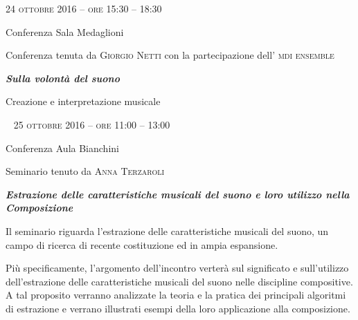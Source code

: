 
\begin{flushright}

\large{
	\scshape{
	24 ottobre 2016 -- ore 15:30 -- 18:30
	}}

\medskip
	
\small{Conferenza
	\newline Sala Medaglioni}

\medskip

{\fontsize{42}{42} }

\normalfont

\normalsize

\bigskip

Conferenza tenuta da \textsc{Giorgio Netti} con la partecipazione dell' \textsc{mdi ensemble}

\bigskip

\textbf{\emph{Sulla volontà del suono}}

Creazione e interpretazione musicale


%
%

~\vfill
\large{
	\scshape{
	25 ottobre 2016 -- ore 11:00 -- 13:00
	}}

\medskip
	
\small{Conferenza
	\newline Aula Bianchini}

\medskip

{\fontsize{42}{42} }

\normalfont

\normalsize

\bigskip

Seminario tenuto da \textsc{Anna Terzaroli}

\bigskip

\textbf{\emph{Estrazione delle caratteristiche musicali del suono e loro utilizzo nella Composizione}}

Il seminario riguarda l'estrazione delle caratteristiche musicali del suono, un campo di ricerca di recente costituzione ed in ampia espansione. 

Più specificamente, l'argomento dell'incontro verterà sul significato e sull'utilizzo dell'estrazione delle caratteristiche musicali del suono nelle discipline compositive. A tal proposito verranno analizzate la teoria e la pratica dei principali algoritmi di estrazione e verrano illustrati esempi della loro applicazione alla composizione.

\end{flushright}

\vfill